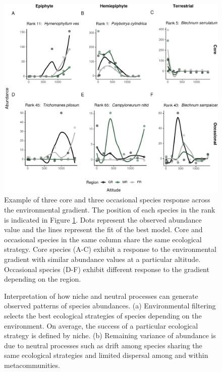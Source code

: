\documentclass[12pt]{article}
\begin{document}
\begin{figure}[!h]
 \begin{center}
\includegraphics[scale=.75]{./fig/core_ocasional_species.pdf}
\end{center}
\caption{Example of three core and three occasional species response across the environmental gradient. The position of each species in the rank is indicated in Figure \ref{fig:spp}. Dots represent the observed abundance value and the lines represent the fit of the best model. Core and occasional species in the same column share the same ecological strategy. Core species (A-C) exhibit a response to the environmental gradient with similar abundance values at a particular altitude. Occasional species (D-F) exhibit different response to the gradient depending on the region.} \label{fig:spp}
\end{figure}


\begin{figure}[!ht]
 \begin{center}
\end{center}
\caption{Interpretation of how niche and neutral processes can generate observed patterns of species abundances. (a) Environmental filtering selects the best ecological strategies of species depending on the environment. On average, the success of a particular ecological strategy is defined by niche. (b) Remaining variance of abundance is due to neutral processes such as drift among species sharing the same ecological strategies and limited dispersal among and within metacommunities.} \label{fig:final}
\end{figure}



\end{document}
